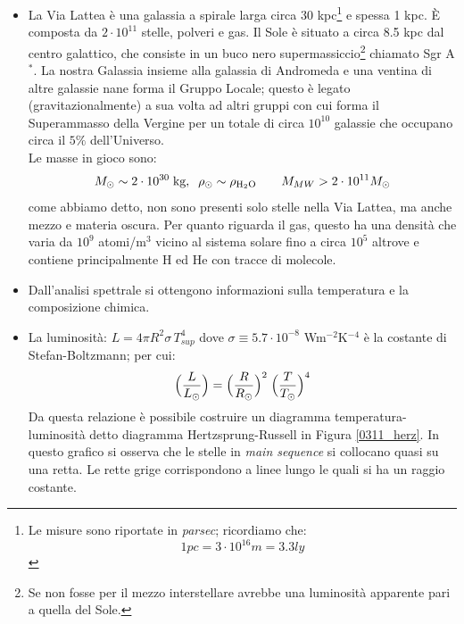 \begin{itemize}
    \item La Via Lattea è una galassia a spirale larga circa 30 kpc\footnote{Le misure sono riportate in \textit{parsec}; ricordiamo che:
    $$1 \unit{pc} = 3\cdot 10^{16} \unit{m} = 3.3 \unit{ly}$$%
    } e spessa 1 kpc. \`E composta da $2\cdot 10^{11}$ stelle, polveri e gas. Il Sole è situato a circa 8.5 kpc dal centro galattico, che consiste in un buco nero supermassiccio\footnote{Se non fosse per il mezzo interstellare avrebbe una luminosità apparente pari a quella del Sole.} chiamato Sgr A$^*$. La nostra Galassia insieme alla galassia di Andromeda e una ventina di altre galassie nane forma il Gruppo Locale; questo è legato (gravitazionalmente) a sua volta ad altri gruppi con cui forma il Superammasso della Vergine per un totale di circa $10^{10}$ galassie che occupano circa il $5\%$ dell'Universo.\\
    Le masse in gioco sono:
    $$M\sol\sim 2\cdot10^{30} \unit{kg}, \;\; \rho\sol \sim \rho_{\ce{H_2O}} \qquad M_{MW} > 2\cdot 10^{11} M\sol$$
    come abbiamo detto, non sono presenti solo stelle nella Via Lattea, ma anche mezzo e materia oscura. Per quanto riguarda il gas, questo ha una densità che varia da $10^9$ atomi/m$^3$ vicino al sistema solare fino a circa $10^5$ altrove e contiene principalmente H ed He con tracce di molecole.
    \item Dall'analisi spettrale si ottengono informazioni sulla temperatura e la composizione chimica.
    \item La luminosità: $L = 4\pi R^2 \sigma\, T_{sup}^4$ dove $\sigma \equiv 5.7\cdot10^{-8}$ Wm$^{-2}$K$^{-4}$ è  la costante di Stefan-Boltzmann; per cui:
    $$\Bigl ( \frac{L}{L_{\odot}} \Bigr ) = \Bigl ( \frac{R}{R_{\odot}}\Bigr )^2 \; \Bigl (\frac{T}{T_{\odot}} \Bigr )^4$$
    Da questa relazione è possibile costruire un diagramma temperatura-luminosità detto diagramma Hertzsprung-Russell in Figura \ref{0311_herz}. In questo grafico si osserva che le stelle in \textit{main sequence} si collocano quasi su una retta. Le rette grige corrispondono a linee lungo le quali si ha un raggio costante.
    \begin{figure}[h]

\end{figure}
\end{itemize}
